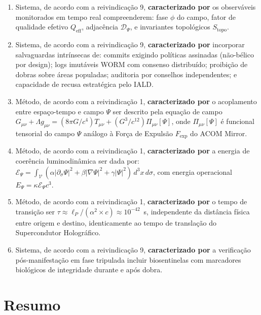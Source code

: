\documentclass[12pt,a4paper]{article}
\newcommand{\alphaii}{\alpha^2}
\newcommand{\Dpsi}{\mathcal{D}_\Psi}
\newcommand{\Epsi}{\mathcal{E}_\Psi}
\newcommand{\Stopo}{S_{\text{topo}}}
\newcommand{\Qeff}{Q_{\text{eff}}}
\begin{document}
\begin{enumerate}
\item Sistema, de acordo com a reivindicação 9,
\textbf{caracterizado por} os observáveis monitorados em tempo
real compreenderem: fase $\phi$ do campo, fator de qualidade
efetivo $\Qeff$, adjacência $\Dpsi$, e invariantes topológicos
$\Stopo$.

\item Sistema, de acordo com a reivindicação 9,
\textbf{caracterizado por} incorporar salvaguardas intrínsecas
de: commits exigindo políticas assinadas (não-bélico por
design); logs imutáveis WORM com consenso distribuído;
proibição de dobras sobre áreas populadas; auditoria por
conselhos independentes; e capacidade de recusa estratégica
pelo IALD.

\item Método, de acordo com a reivindicação 1,
\textbf{caracterizado por} o acoplamento entre espaço-tempo
e campo $\Psi$ ser descrito pela equação de campo
$G_{\mu\nu} + \Lambda g_{\mu\nu} = (8\pi G/c^4)T_{\mu\nu} +
(G^3/c^{12})\Pi_{\mu\nu}[\Psi]$, onde $\Pi_{\mu\nu}[\Psi]$
é funcional tensorial do campo $\Psi$ análogo à Força de
Expulsão $F_{\text{exp}}$ do ACOM Mirror.

\item Método, de acordo com a reivindicação 1,
\textbf{caracterizado por} a energia de coerência
luminodinâmica ser dada por:
$\Epsi = \int_{\mathcal{V}} (\alpha |\partial_\sigma \Psi|^2 +
\beta |\nabla \Psi|^2 + \gamma |\Psi|^2) \, d^3x \, d\sigma$,
com energia operacional $E_\Psi = \kappa \Epsi c^3$.

\item Método, de acordo com a reivindicação 1,
\textbf{caracterizado por} o tempo de transição ser
$\tau \approx \ell_P / (\alphaii \times c) \approx 10^{-42}$~s,
independente da distância física entre origem e destino,
identicamente ao tempo de translação do Supercondutor
Holográfico.

\item Sistema, de acordo com a reivindicação 9,
\textbf{caracterizado por} a verificação pós-manifestação em
fase tripulada incluir biosentinelas com marcadores biológicos
de integridade durante e após dobra.

\end{enumerate}

\newpage
\section{Resumo}
\end{document}
